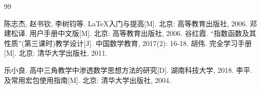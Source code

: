 \begin{thebibliography}{99}\bigskip
{}
\setlength{\itemsep}{-0.75ex}

 陈志杰, 赵书钦, 李树钧等. \LaTeX{}入门与提高[M]. 北京: 高等教育出版社, 2006.
 邓建松译. \LaTeXe{}用户手册中文版[M]. 北京: 高等教育出版社, 2006.
 谷红霞.  “指数函数及其性质”(第三课时)教学设计[J]. 中国数学教育, 2017(2): 16-18.
 胡伟. \LaTeXe{}完全学习手册[M]. 北京: 清华大学出版社, 2011.

 乐小良. 高中三角教学中渗透数学思想方法的研究[D]. 湖南科技大学, 2018.
 李平. \LaTeXe{}及常用宏包使用指南[M]. 北京: 清华大学出版社, 2004.
\end{thebibliography}

